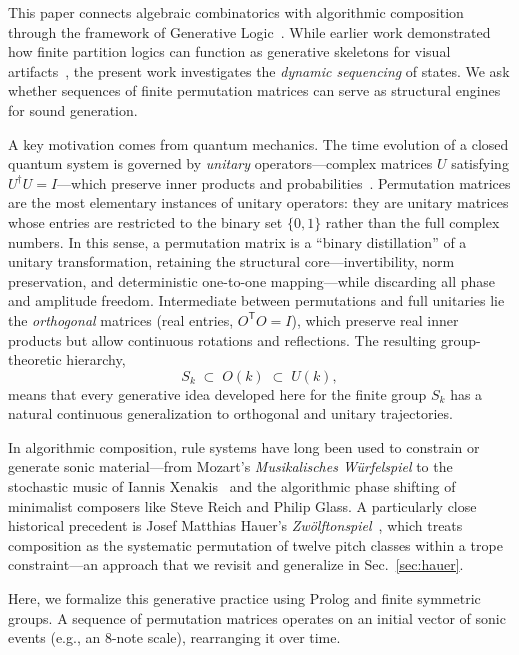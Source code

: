 \documentclass[
  twocolumn,
  aps,
  pra,
  showkeys,
  amsmath,amssymb,
  longbibliography
]{revtex4-2}
\begin{document}
This paper connects algebraic combinatorics with algorithmic
composition through the framework of Generative
Logic~\cite{Jendreiko2024,Jendreiko2025}.
While earlier work demonstrated how finite partition logics
can function as generative skeletons for visual
artifacts~\cite{jendreiko-svozil-2026}, the present work
investigates the \emph{dynamic sequencing} of states.
We ask whether sequences of finite permutation matrices can
serve as structural engines for sound generation.

A key motivation comes from quantum mechanics.
The time evolution of a closed quantum system is governed by
\emph{unitary} operators---complex matrices $U$ satisfying
$U^\dagger U=I$---which preserve inner products and
probabilities~\cite{vonneumann-32,peres-93}.
Permutation matrices are the most elementary instances of
unitary operators: they are unitary matrices whose entries are
restricted to the binary set $\{0,1\}$ rather than the full
complex numbers.
In this sense, a permutation matrix is a ``binary
distillation'' of a unitary transformation, retaining the
structural core---invertibility, norm preservation, and
deterministic one-to-one mapping---while discarding all phase
and amplitude freedom.
Intermediate between permutations and full unitaries lie the
\emph{orthogonal} matrices (real entries, $O^{\mathsf T}O=I$),
which preserve real inner products but allow continuous
rotations and reflections.
The resulting group-theoretic hierarchy,
\begin{equation}
S_k \;\subset\; O(k) \;\subset\; U(k),
\label{eq:hierarchy}
\end{equation}
means that every generative idea developed here for the finite
group $S_k$ has a natural continuous generalization to
orthogonal and unitary trajectories.

In algorithmic composition, rule systems have long been used
to constrain or generate sonic material---from Mozart's
\emph{Musikalisches W\"urfelspiel} to the stochastic music of
Iannis Xenakis~\cite{xenakis-71} and the algorithmic phase
shifting of minimalist composers like Steve Reich and Philip
Glass. A particularly close historical precedent is Josef Matthias
Hauer's \emph{Zw\"olftonspiel}~\cite{hauer-25}, which treats
composition as the systematic permutation of twelve pitch
classes within a trope constraint---an approach that we
revisit and generalize in Sec.~\ref{sec:hauer}.

Here, we formalize this generative practice using Prolog and
finite symmetric groups.
A sequence of permutation matrices operates on an initial
vector of sonic events (e.g., an 8-note scale), rearranging it
over time.
\end{document}
